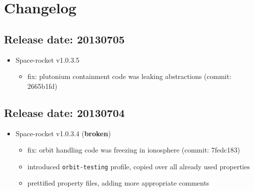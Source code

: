 \section{Changelog}

\subsection{Release date: 20130705}
\begin{itemize}
  \item Space-rocket v1.0.3.5
  \begin{itemize}
    \item fix: plutonium containment code was leaking abstractions
    (commit: 2665b1fd)
  \end{itemize}
\end{itemize}

\subsection{Release date: 20130704}
\begin{itemize}
  \item Space-rocket v1.0.3.4 (\textbf{broken})
  \begin{itemize}
    \item fix: orbit handling code was freezing in ionosphere
    (commit: 7fedc183)

    \item introduced \texttt{orbit-testing} profile, copied over all
          already used properties

    \item prettified property files, adding more appropriate comments
  \end{itemize}
\end{itemize}
